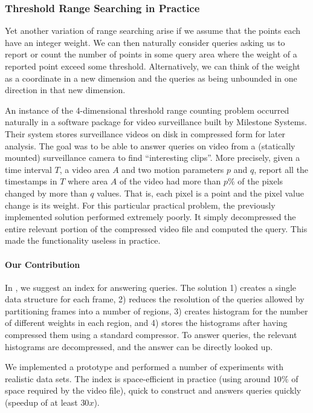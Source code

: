 \clearpage
\subsubsection{Threshold Range Searching in Practice}
Yet another variation of range searching arise if we assume that the points each have an integer weight. We can then naturally consider queries asking us to report or count the number of points in some query area where the weight of a reported point exceed some threshold. 
Alternatively, we can think of the weight as a coordinate in a new dimension and the queries as being unbounded in one direction in that new dimension.

An instance of the 4-dimensional threshold range counting problem occurred naturally in a software package for video surveillance built by Milestone Systems. Their system stores surveillance videos on disk in compressed form for later analysis. The goal was to be able to answer  queries on video from a (statically mounted) surveillance camera to find ``interesting clips''. More precisely, given a time interval $T$, a video area $A$ and two motion parameters $p$ and $q$, report all the timestamps in $T$ where area $A$ of the video had more than $p\%$ of the pixels changed by more than $q$ values. That is, each pixel is a point and the pixel value change is its weight.
For this particular practical problem, the previously implemented solution performed extremely poorly. It simply decompressed the entire relevant portion of the compressed video file and computed the query. This made the functionality useless in practice. 

\paragraph{Our Contribution} 
In , we suggest an index for answering  queries. The solution 1) creates a single data structure for each frame, 2) reduces the resolution of the queries allowed by partitioning frames into a number of regions, 3) creates histogram for the number of different weights in each region, and 4) stores the histograms after having compressed them using a standard compressor. To answer queries, the relevant histograms are decompressed, and the answer can be directly looked up.

We implemented a prototype and performed a number of experiments with realistic data sets. The index is space-efficient in practice (using around $10\%$ of space required by the video file), quick to construct and answers queries quickly (speedup of at least $30x$). 

